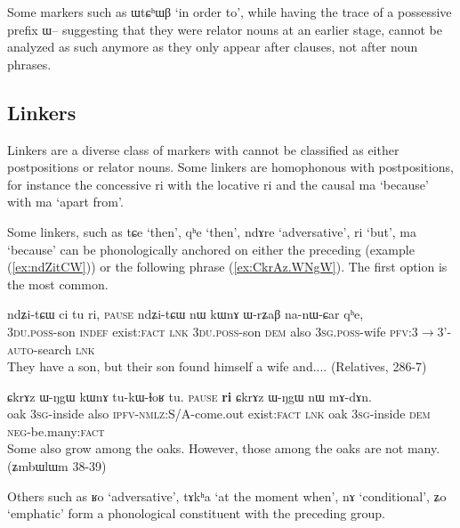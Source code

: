 \documentclass[oldfontcommands,oneside,a4paper,11pt]{article}
\newcommand{\ipa}[1]{{\phon \mbox{#1}}} %
\newcommand{\refb}[1]{(\ref{#1})}
\begin{document}
Some markers such as  \ipa{ɯtɕʰɯβ} `in order to', while having the trace of a possessive prefix \ipa{ɯ--} suggesting that they were relator nouns at an earlier stage, cannot be analyzed as such anymore as they only appear after clauses, not after noun phrases.

\subsection{Linkers} \label{sec:linkers}
Linkers are a diverse class of markers with cannot be classified as either postpositions or relator nouns.   Some linkers are homophonous with postpositions, for instance the concessive \ipa{ri} with the locative \ipa{ri} and the causal \ipa{ma} `because' with \ipa{ma} `apart from'.

Some linkers, such as    \ipa{tɕe}  `then', \ipa{qʰe} `then', \ipa{ndɤre} `adversative', \ipa{ri} `but', \ipa{ma}  `because' can be phonologically anchored on either the preceding (example \refb{ex:ndZitCW}) or the following phrase \refb{ex:CkrAz.WNgW}. The first option is the most common.  
 \begin{exe}
\ex \label{ex:ndZitCW} 
\gll
\ipa{ndʑi-tɕɯ}   	\ipa{ci}   	\ipa{tu}   	\ipa{ri,}  \textsc{pause} 	\ipa{ndʑi-tɕɯ}   	\ipa{nɯ}   	\ipa{kɯnɤ}   	\ipa{ɯ-rʑaβ}   	\ipa{na-nɯ-ɕar}   	\ipa{qʰe,}   \\
\textsc{3du.poss}-son \textsc{indef} exist:\textsc{fact} \textsc{lnk} {  } \textsc{3du.poss}-son  \textsc{dem} also \textsc{3sg.poss}-wife \textsc{pfv}:3$\rightarrow$3'-\textsc{auto}-search \textsc{lnk} \\
\glt They have a son, but their son found himself a wife and.... (Relatives, 286-7)
\end{exe}
 \begin{exe}
\ex \label{ex:CkrAz.WNgW} 
\gll
\ipa{ɕkrɤz}   	\ipa{ɯ-ŋgɯ}   	\ipa{kɯnɤ}   	\ipa{tu-kɯ-ɬoʁ}   	\ipa{tu.}   \textsc{pause}	\ipa{\textbf{ri}}   	\ipa{ɕkrɤz}   	\ipa{ɯ-ŋgɯ}   	\ipa{nɯ}   	\ipa{mɤ-dɤn.}   \\
oak \textsc{3sg}-inside  also \textsc{ipfv-nmlz}:S/A-come.out exist:\textsc{fact} {  } \textsc{lnk} oak \textsc{3sg}-inside \textsc{dem} \textsc{neg}-be.many:\textsc{fact} \\
\glt Some also grow among the oaks. However, those among the oaks are not many. (\ipa{ʑmbɯlɯm} 38-39)
\end{exe}

Others such as \ipa{ʁo} `adversative', \ipa{tɤkʰa} `at the moment when', \ipa{nɤ} `conditional', \ipa{ʑo} `emphatic' form a phonological constituent with the preceding group.
\end{document}
